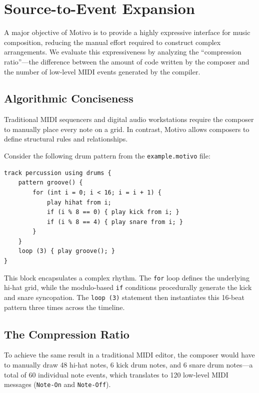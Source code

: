 \section{Source-to-Event Expansion}\label{sec:compression}

A major objective of Motivo is to provide a highly expressive interface for music composition, reducing the
manual effort
required to construct complex arrangements.
We evaluate this expressiveness by analyzing the ``compression ratio''---the difference between the amount of code
written by the composer and the number of low-level MIDI events generated by the compiler.

\subsection{Algorithmic Conciseness}\label{detail-subsec:algorithmic-conciseness}

Traditional MIDI sequencers and digital audio workstations require the composer to manually place every note on a grid.
In contrast, Motivo allows composers to define structural rules and relationships.

Consider the following drum pattern from the \texttt{example.motivo} file:
\begin{lstlisting}[language=Motivo, caption={A generative drum pattern using control flow.},label={lst:evaluation-drum-pattern}]
track percussion using drums {
    pattern groove() {
        for (int i = 0; i < 16; i = i + 1) {
            play hihat from i;
            if (i % 8 == 0) { play kick from i; }
            if (i % 8 == 4) { play snare from i; }
        }
    }
    loop (3) { play groove(); }
}
\end{lstlisting}

This block encapsulates a complex rhythm.
The \texttt{for} loop defines the underlying hi-hat grid, while the modulo-based \texttt{if} conditions procedurally
generate the kick and snare syncopation.
The \texttt{loop (3)} statement then instantiates this 16-beat pattern three times across the timeline.

\subsection{The Compression Ratio}\label{detail-subsec:the-compression-ratio}

To achieve the same result in a traditional MIDI editor, the composer would have to manually draw 48 hi-hat notes, 6
kick drum notes, and 6 snare drum notes---a total of 60 individual note events, which translates to 120 low-level MIDI
messages (\texttt{Note-On} and \texttt{Note-Off}).

